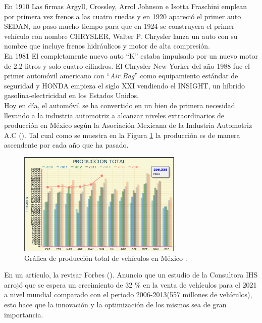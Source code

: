 En 1910 Las firmas Argyll, Crossley, Arrol Johnson e Isotta Fraschini emplean por primera vez frenos a las cuatro ruedas y en 1920 apareció el primer auto SEDAN, no paso mucho tiempo para que en 1924 se construyera el primer vehículo con nombre CHRYSLER, Walter P. Chrysler lanza un auto con su nombre que incluye frenos hidráulicos y motor de alta compresión.\\

En 1981 El completamente nuevo auto ``K'' estaba impulsado por un nuevo motor de 2.2 litros y solo cuatro cilindros. El Chrysler New Yorker del año 1988 fue el primer automóvil americano con ``\textit{Air Bag}'' como equipamiento estándar de seguridad y HONDA empieza el siglo XXI vendiendo el INSIGHT, un híbrido gasolina-electricidad en los Estados Unidos.\\


Hoy en día, el automóvil se ha convertido en un bien de primera necesidad llevando a la industria automotriz a alcanzar niveles extraordinarios de producción en México según la Asociación Mexicana de la Industria Automotriz A.C (\cite{UPS-16}). Tal cual como se muestra en la Figura \ref{Fcero1} la producción es de manera ascendente por cada año que ha pasado.


%
\begin{figure}[H]
\centering
\includegraphics[width=0.7\textwidth]{introduccion/fig14.jpg}
\caption{Gráfica de producción total de vehículos en México \cite{UPS-16}. }
\label{Fcero1}
\end{figure}

En un artículo, la revisar Forbes (\cite{UPS-15}). Anuncio que un estudio de la Consultora IHS arrojó que se espera un crecimiento de 32 \% en la venta de vehículos para el 2021 a nivel mundial comparado con el periodo 2006-2013(557 millones de vehículos), esto hace que la innovación y la optimización de los mismos sea de gran importancia.\\

